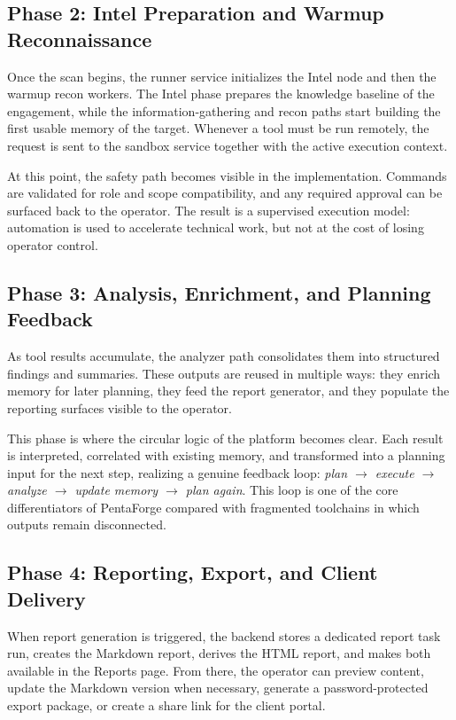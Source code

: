 \documentclass[12pt,a4paper]{report}
\begin{document}
\subsection{Phase 2: Intel Preparation and Warmup Reconnaissance}

Once the scan begins, the runner service initializes the Intel node and then the
warmup recon workers. The Intel phase prepares the knowledge baseline of the
engagement, while the information-gathering and recon paths start building the first
usable memory of the target. Whenever a tool must be run remotely, the request is
sent to the sandbox service together with the active execution context.

At this point, the safety path becomes visible in the implementation. Commands are
validated for role and scope compatibility, and any required approval can be surfaced
back to the operator. The result is a supervised execution model: automation is used
to accelerate technical work, but not at the cost of losing operator control.

\subsection{Phase 3: Analysis, Enrichment, and Planning Feedback}

As tool results accumulate, the analyzer path consolidates them into structured
findings and summaries. These outputs are reused in multiple ways: they enrich memory
for later planning, they feed the report generator, and they populate the reporting
surfaces visible to the operator.

This phase is where the circular logic of the platform becomes clear. Each result is
interpreted, correlated with existing memory, and transformed into a planning input
for the next step, realizing a genuine feedback loop:
\emph{plan $\rightarrow$ execute $\rightarrow$ analyze $\rightarrow$ update memory
$\rightarrow$ plan again}. This loop is one of the core differentiators of
PentaForge compared with fragmented toolchains in which outputs remain disconnected.

\subsection{Phase 4: Reporting, Export, and Client Delivery}

When report generation is triggered, the backend stores a dedicated report task run,
creates the Markdown report, derives the HTML report, and makes both available in the
Reports page. From there, the operator can preview content, update the Markdown
version when necessary, generate a password-protected export package, or create a
share link for the client portal.
\end{document}
